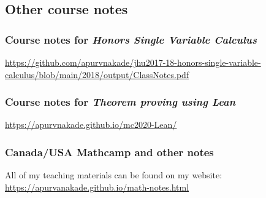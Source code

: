 \documentclass[
]{report}
\begin{document}
\hypertarget{other-course-notes}{%
\subsection{Other course notes}\label{other-course-notes}}

\hypertarget{course-notes-for-honors-single-variable-calculus}{%
\subsubsection{\texorpdfstring{Course notes for \emph{Honors Single Variable Calculus}}{Course notes for Honors Single Variable Calculus}}\label{course-notes-for-honors-single-variable-calculus}}

\url{https://github.com/apurvnakade/jhu2017-18-honors-single-variable-calculus/blob/main/2018/output/ClassNotes.pdf}

\hypertarget{course-notes-for-theorem-proving-using-lean}{%
\subsubsection{\texorpdfstring{Course notes for \emph{Theorem proving using Lean}}{Course notes for Theorem proving using Lean}}\label{course-notes-for-theorem-proving-using-lean}}

\url{https://apurvnakade.github.io/mc2020-Lean/}

\hypertarget{canadausa-mathcamp-and-other-notes}{%
\subsubsection{Canada/USA Mathcamp and other notes}\label{canadausa-mathcamp-and-other-notes}}

All of my teaching materials can be found on my website: \url{https://apurvanakade.github.io/math-notes.html}
\end{document}

